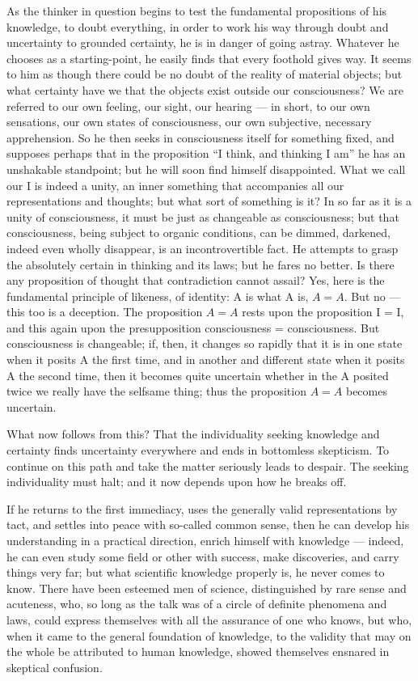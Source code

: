 \documentclass[12pt]{book}
\begin{document}
As the thinker in question begins to test the fundamental propositions of
his knowledge, to doubt everything, in order to work his way through doubt
and uncertainty to grounded certainty, he is in danger of going astray.
Whatever he chooses as a starting-point, he easily finds that every foothold
gives way. It seems to him as though there could be no doubt of the reality
of material objects; but what certainty have we that the objects exist
outside our consciousness? We are referred to our own feeling, our sight, our
hearing --- in short, to our own sensations, our own states of consciousness,
our own subjective, necessary apprehension. So he then seeks in consciousness
itself for something fixed, and supposes perhaps that in the proposition ``I
think, and thinking I am'' he has an unshakable standpoint; but he will soon
find himself disappointed. What we call our I is indeed a unity, an inner
something that accompanies all our representations and thoughts; but what
sort of something is it? In so far as it is a unity of consciousness, it must
be just as changeable as consciousness; but that consciousness, being subject
to organic conditions, can be dimmed, darkened, indeed even wholly
disappear, is an incontrovertible fact. He attempts to grasp the absolutely
certain in thinking and its laws; but he fares no better. Is there any
proposition of thought that contradiction cannot assail? Yes, here is the
fundamental principle of likeness, of identity: A is what A is, $A = A$. But
no --- this too is a deception. The proposition $A = A$ rests upon the
proposition I = I, and this again upon the presupposition consciousness =
consciousness. But consciousness is changeable; if, then, it changes so
rapidly that it is in one state when it posits A the first time, and in
another and different state when it posits A the second time, then it becomes
quite uncertain whether in the A posited twice we really have the selfsame
thing; thus the proposition $A = A$ becomes uncertain.

What now follows from this? That the individuality seeking knowledge and
certainty finds uncertainty everywhere and ends in bottomless skepticism. To
continue on this path and take the matter seriously leads to despair. The
seeking individuality must halt; and it now depends upon how he breaks off.

If he returns to the first immediacy, uses the generally valid
representations by tact, and settles into peace with so-called common sense,
then he can develop his understanding in a practical direction, enrich
himself with knowledge --- indeed, he can even study some field or other with
success, make discoveries, and carry things very far; but what scientific
knowledge properly is, he never comes to know. There have been esteemed men
of science, distinguished by rare sense and acuteness, who, so long as the
talk was of a circle of definite phenomena and laws, could express
themselves with all the assurance of one who knows, but who, when it came to
the general foundation of knowledge, to the validity that may on the whole be
attributed to human knowledge, showed themselves ensnared in skeptical
confusion.
\end{document}
